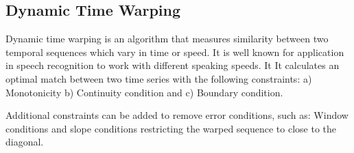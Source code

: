 \documentclass[hidelinks,BTech]{iitmdiss}
\begin{document}
\subsection*{Dynamic Time Warping}

Dynamic time warping is an algorithm that measures similarity between two temporal sequences which vary in time or speed. It is well known for application in speech recognition\cite{DTW} to work with different speaking speeds. It It calculates an optimal match between two time series with the following constraints: a) Monotonicity b) Continuity condition and c) Boundary condition.

Additional constraints can be added to remove error conditions, such as: Window conditions and slope conditions restricting the warped sequence to close to the diagonal.
\end{document}
